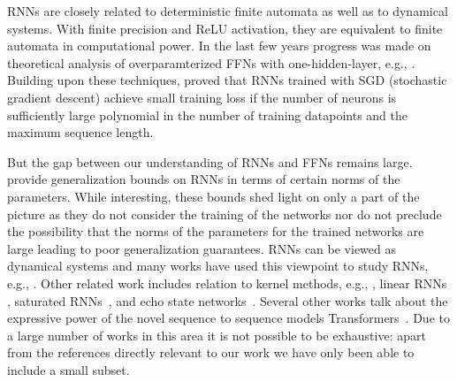 RNNs are closely related to deterministic finite automata \cite{korsky2019computational, WeissGY18} as well as to dynamical systems. With finite precision and ReLU activation, they are equivalent to finite automata \cite{korsky2019computational} in computational power.
In the last few years progress was made on theoretical analysis of overparamterized FFNs with one-hidden-layer, e.g., \cite{JacotNTK, LiLiang2018, du2018gradient, allen2019learning, quanquan, Arora_Generalization, ghorbani2021linearized}. Building upon these techniques,
\cite{allen2019convergence_rnn} proved that RNNs trained with SGD (stochastic gradient descent) achieve small training loss if the number of neurons is sufficiently large polynomial in the number of training datapoints and the maximum sequence length. 

But the gap between our understanding of RNNs and FFNs remains large. \cite{Tao_generalization_RNN, generalization_zhao} provide generalization bounds on RNNs in terms of certain norms of the parameters. While interesting, these bounds shed light on only a part of the picture as they do not consider the training of the networks nor do not preclude the possibility that the norms of the parameters for the trained networks are large leading to poor generalization guarantees.
RNNs can be viewed as dynamical systems and many works have used this viewpoint to study RNNs, e.g., \cite{HardtMR16, MillerH19, pmlr-v99-oymak19a, maheswaranathan2019reverse}. Other related work includes relation to kernel methods, e.g., \cite{Yang19, RNTK, alemohammad2020scalable}, linear RNNs \cite{emami2021implicit}, saturated RNNs~\cite{merrill2019sequential, merrill2020formal, merrill2021formal}, and echo state networks~\cite{grigoryeva2018echo, ozturk2007analysis}. Several other works talk about the expressive power of the novel sequence to sequence models  Transformers~\cite{yun2019transformers, yun2020n}. Due to a large number of works in this area it is not possible to be exhaustive: apart from the references directly relevant to our work we have only been able to include a small subset. 


